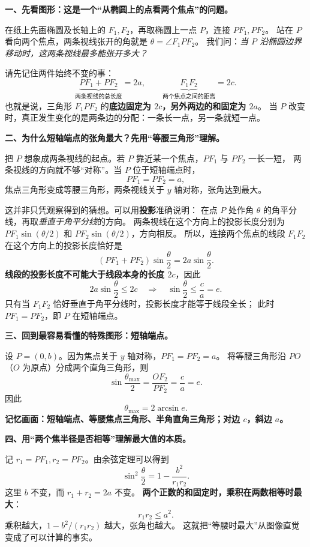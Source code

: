 \begin{explanationbox}
\textbf{一、先看图形：这是一个“从椭圆上的点看两个焦点”的问题。}

在纸上先画椭圆及长轴上的 $F_1,F_2$，再取椭圆上一点 $P$，连接 $PF_1,PF_2$。
站在 $P$ 看向两个焦点，两条视线张开的角就是 $\theta=\angle F_1PF_2$。
我们问：\emph{当 $P$ 沿椭圆边界移动时，这两条视线最多能张开多大？}

请先记住两件始终不变的事：
\[
\underbrace{PF_1+PF_2}_{\text{两条视线的总长度}}=2a,\qquad
\underbrace{F_1F_2}_{\text{两个焦点之间的距离}}=2c.
\]
也就是说，三角形 $F_1PF_2$ 的\textbf{底边固定为 $2c$，另外两边的和固定为 $2a$}。
当 $P$ 改变时，真正发生变化的是两条边的分配：一条长一点，另一条就短一点。

\medskip
\textbf{二、为什么短轴端点的张角最大？先用“等腰三角形”理解。}

把 $P$ 想象成两条视线的起点。若 $P$ 靠近某一个焦点，$PF_1$ 与 $PF_2$ 一长一短，
两条视线的方向就不够“对称”。当 $P$ 位于短轴端点时，
\[
PF_1=PF_2=a,
\]
焦点三角形变成等腰三角形，两条视线关于 $y$ 轴对称，张角达到最大。

这并非只凭观察得到的猜想。可以用\textbf{投影}准确说明：
在点 $P$ 处作角 $\theta$ 的角平分线，再取\emph{垂直于角平分线}的方向。
两条视线在这个方向上的投影长度分别为
$PF_1\sin(\theta/2)$ 和 $PF_2\sin(\theta/2)$，方向相反。
所以，连接两个焦点的线段 $F_1F_2$ 在这个方向上的投影长度恰好是
\[
(PF_1+PF_2)\sin\frac{\theta}{2}
=2a\sin\frac{\theta}{2}.
\]
\textbf{线段的投影长度不可能大于线段本身的长度 $2c$}，因此
\[
2a\sin\frac{\theta}{2}\le2c
\quad\Longrightarrow\quad
\boxed{\sin\frac{\theta}{2}\le\frac ca=e.}
\]
只有当 $F_1F_2$ 恰好垂直于角平分线时，投影长度才能等于线段全长；
此时 $PF_1=PF_2$，即 $P$ 在短轴端点。

\medskip
\textbf{三、回到最容易看懂的特殊图形：短轴端点。}

设 $P=(0,b)$。因为焦点关于 $y$ 轴对称，$PF_1=PF_2=a$。
将等腰三角形沿 $PO$（$O$ 为原点）分成两个直角三角形，则
\[
\sin\frac{\theta_{\max}}2
=\frac{OF_2}{PF_2}
=\frac ca=e.
\]
因此
\[
\boxed{\theta_{\max}=2\arcsin e.}
\]
\textbf{记忆画面：短轴端点、等腰焦点三角形、半角直角三角形；对边 $c$，斜边 $a$。}

\medskip
\textbf{四、用“两个焦半径是否相等”理解最大值的本质。}

记 $r_1=PF_1,r_2=PF_2$。由余弦定理可以得到
\[
\sin^2\frac\theta2=1-\frac{b^2}{r_1r_2}.
\]
这里 $b$ 不变，而 $r_1+r_2=2a$ 不变。
\textbf{两个正数的和固定时，乘积在两数相等时最大}：
\[
r_1r_2\le a^2.
\]
乘积越大，$1-b^2/(r_1r_2)$ 越大，张角也越大。
这就把“等腰时最大”从图像直觉变成了可以计算的事实。


\end{explanationbox}
